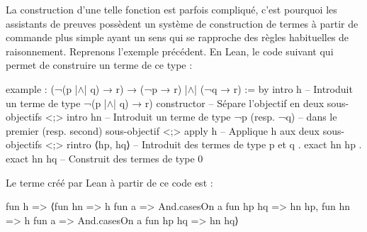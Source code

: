 \documentclass[../../rapport.tex]{subfiles}
\begin{document}
  La construction d'une telle fonction est parfois compliqué, c'est pourquoi les assistants de preuves possèdent
  un système de construction de termes à partir de commande plus simple ayant un sens qui se rapproche des règles habituelles
  de raisonnement.
  Reprenons l'exemple précédent. En Lean, le code suivant qui permet de construire un terme de ce type :
  \begin{lean4code}
    example : (¬(p |$\wedge$| q) → r) → (¬p → r) |$\wedge$| (¬q → r) := by
      intro h 	    -- Introduit un terme de type ¬(p |$\wedge$| q) → r)
      constructor 	-- Sépare l'objectif en deux sous-objectifs
      <;> intro hn        -- Introduit un terme de type ¬p (resp. ¬q)
                          -- dans le premier (resp. second) sous-objectif
      <;> apply h 	-- Applique h aux deux sous-objectifs
      <;> rintro ⟨hp, hq⟩ -- Introduit des termes de type p et q
      . exact hn hp
      . exact hn hq       -- Construit des termes de type 0
  \end{lean4code}
  Le terme créé par Lean à partir de ce code est :
  \begin{lean4code}
    fun h =>
      ⟨fun hn => h fun a => And.casesOn a fun hp hq => hn hp,
       fun hn => h fun a => And.casesOn a fun hp hq => hn hq⟩
  \end{lean4code}
\end{document}
